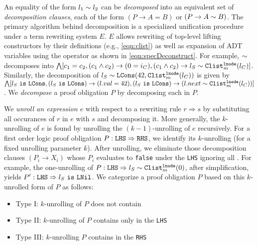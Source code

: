An equality \recursiveRelation{} of the form $l_1 \sim{} l_2$ can be {\em decomposed} into an
equivalent set of {\em decomposition clauses}, each of the form $(P \rightarrow A = B)$ or $(P \rightarrow A \sim{} B)$.
The primary algorithm behind decomposition is a specialized unification procedure under a term rewriting
system $E$. $E$ allows rewriting of top-level lifting constructors by their definitions (e.g., \cref{eqn:clist})
as well as expansion of ADT variables using the \sumDtor{} operator as shown in \cref{eqn:specDeconstruct}.
For example, $\sim{}$
decomposes into $\bigwedge[c_1=c_2, (c_1 \land c_2) \rightarrow (0=i_C), (c_1 \land c_2) \rightarrow l_S \sim{} {\tt Clist}_m^{\tt lnode}(l_C)]$.
Similarly, the decomposition of $l_S\sim{}{\tt LCons}(42,{\tt Clist}_m^{\tt lnode}(l_C))$ is given by
$\bigwedge [l_S\ {\tt is}\ {\tt LCons}, (l_S\ {\tt is}\ {\tt LCons}) \rightarrow (l.val=42), (l_S\ {\tt is}\ {\tt LCons}) \rightarrow (l.next \sim{} {\tt Clist}_m^{\tt lnode}(l_C))]$.
We {\em decompose} a proof obligation $P$ by decomposing each \recursiveRelation{} in $P$.

We {\em unroll an expression $e$} with respect to a rewriting rule $r \Rightarrow s$ by substituting
all occurances of $r$ in $e$ with $s$ and decomposing it. More generally, the $k$-unrolling of $e$ is found
by unrolling the $(k-1)$-unrolling of $e$ recursively. For a first order logic proof obligation $P:{\tt LHS}\Rightarrow{\tt RHS}$,
we identify its $k$-unrolling (for a fixed unrolling parameter $k$). After unrolling, we eliminate those
decomposition clauses $(P_i \rightarrow X_i)$ whose $P_i$ evaluates to {\tt false} under the {\tt LHS} ignoring all \recursiveRelations{}.
For example, the one-unrolling of $P:{\tt LHS} \Rightarrow l_S \sim{} {\tt Clist}_m^{\tt lnode}(0)$, after simplification, yields
$P': {\tt LHS} \Rightarrow l_S\ {\tt is}\ {\tt LNil}$. We categorize a proof obligation $P$ based on this $k$-unrolled form of $P$ as follows:
\begin{itemize}
    \item Type I: $k$-unrolling of $P$ does not contain \recursiveRelations{}
    \item Type II: $k$-unrolling of $P$ contains \recursiveRelations{} only in the {\tt LHS}
    \item Type III: $k$-unrolling $P$ contains \recursiveRelations{} in the {\tt RHS}
\end{itemize}

